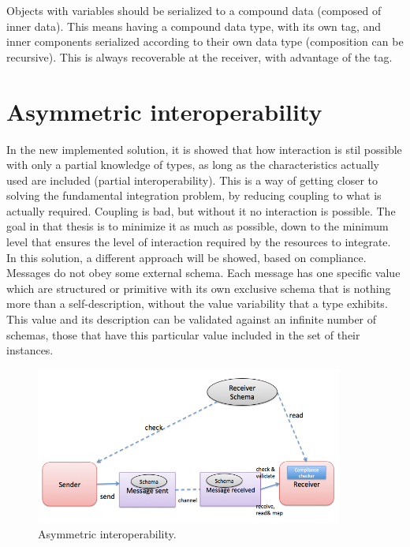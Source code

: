 Objects with variables should be serialized to a compound data (composed of inner data). This means having a compound data type, with its own tag, and inner components serialized according to their own data type (composition can be recursive). This is always recoverable at the receiver, with advantage of the tag.

\section{Asymmetric interoperability}
\label{section:AsymmetricInteroperability}

In the new implemented solution, it is showed that how interaction is stil possible with only a partial knowledge of types, as long as the characteristics actually used are included (partial interoperability). This is a way of getting closer to solving the fundamental integration problem, by reducing coupling to what is actually required. Coupling is bad, but without it no interaction is possible. The goal in that thesis is to minimize it as much as
possible, down to the minimum level that ensures the level of interaction required by the resources to integrate.\\

In this solution, a different approach will be showed, based on compliance. Messages do not obey some external schema. Each message has one specific value which are structured or primitive with its own exclusive schema that is nothing more than a self-description, without the value variability that a type exhibits. This value and its description can be validated against an infinite number of schemas, those that have this particular value included in the set of their instances.\\
\begin{figure}[!htb]
 \centering
 \includegraphics[width=0.9\textwidth]{Figures/asyc.png}
 \caption[Asymmetric interoperability.]{Asymmetric interoperability.}
 \label{fig:Asymmetric}
\end{figure}

